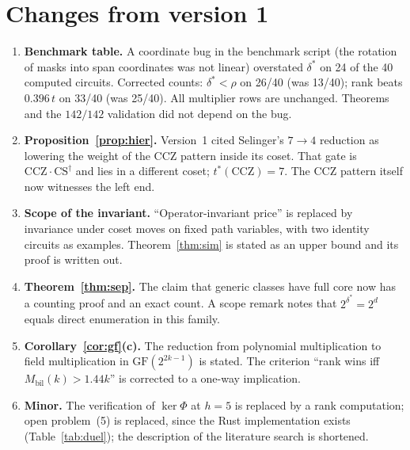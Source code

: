 \documentclass[11pt]{article}
\theoremstyle{definition}
\theoremstyle{remark}
\newcommand{\ds}{\delta^{*}}
\newcommand{\ts}{t^{*}}
\newcommand{\Mbil}{M_{\mathrm{bil}}}
\begin{document}
\section{Changes from version 1}\label{app:changes}

\begin{enumerate}[leftmargin=*]
\item \textbf{Benchmark table.} A coordinate bug in the benchmark script (the rotation of masks into span coordinates was
not linear) overstated $\ds$ on 24 of the 40 computed circuits. Corrected counts: $\ds<\rho$ on 26/40 (was 13/40); rank beats
$0.396\,t$ on 33/40 (was 25/40). All multiplier rows are unchanged. Theorems and the $142/142$ validation did not depend on the bug.
\item \textbf{Proposition~\ref{prop:hier}.} Version~1 cited Selinger's $7\to4$ reduction as lowering the weight of the CCZ pattern inside its coset.
That gate is $\mathrm{CCZ}\cdot\mathrm{CS}^{\dagger}$ and lies in a different coset; $\ts(\mathrm{CCZ})=7$. The CCZ pattern itself now witnesses the left end.
\item \textbf{Scope of the invariant.} ``Operator-invariant price'' is replaced by invariance under coset moves on fixed path variables, with
two identity circuits as examples. Theorem~\ref{thm:sim} is stated as an upper bound and its proof is written out.
\item \textbf{Theorem~\ref{thm:sep}.} The claim that generic classes have full core now has a counting proof and an exact count. A scope remark
notes that $2^{\ds}=2^d$ equals direct enumeration in this family.
\item \textbf{Corollary~\ref{cor:gf}(c).} The reduction from polynomial multiplication to field multiplication in $\mathrm{GF}(2^{2k-1})$ is stated. The
criterion ``rank wins iff $\Mbil(k)>1.44k$'' is corrected to a one-way implication.
\item \textbf{Minor.} The verification of $\ker\Phi$ at $h=5$ is replaced by a rank computation; open problem~(5) is replaced, since the Rust
implementation exists (Table~\ref{tab:duel}); the description of the literature search is shortened.
\end{enumerate}
\end{document}
